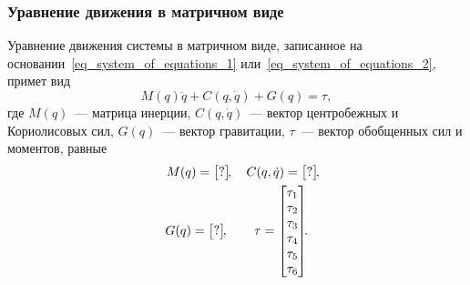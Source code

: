 \subsubsection{Уравнение движения в матричном виде}
Уравнение движения системы в матричном виде, записанное на основании~\eqref{eq_system_of_equations_1} или~\eqref{eq_system_of_equations_2}, примет вид
\begin{equation}\label{eq:eq_of_motion}
    M(q)\ddot{q} + C(q,\dot{q}) + G(q) = \tau,
\end{equation}
где $M(q)$~--- матрица инерции, $C(q,\dot{q})$~--- вектор центробежных и Кориолисовых сил, $G(q)$~--- вектор гравитации, $\tau$~--- вектор обобщенных сил и моментов, равные
\begin{gather}
    \quad
    M(q) =
    \begin{bmatrix}
        ?
    \end{bmatrix}\!\!,
    \quad
    C(q,\dot{q}) =
    \begin{bmatrix}
        ?
    \end{bmatrix}\!\!,
    \\
    G(q) =
    \begin{bmatrix}
        ?
    \end{bmatrix}\!\!,
    \qquad
    \tau =
    \begin{bmatrix}
        \tau_1 \\ \tau_2 \\ \tau_3 \\ \tau_4 \\ \tau_5 \\ \tau_6
    \end{bmatrix}\!\!\ldotp
\end{gather}

\newpage
